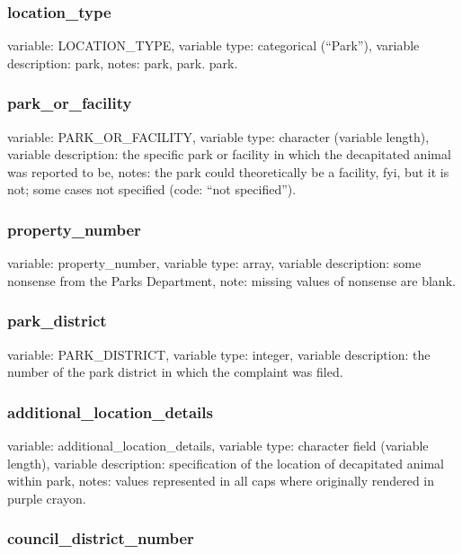 \documentclass[]{article}
\begin{document}
\subsubsection{location\_type}\label{locationux5ftype}

variable: LOCATION\_TYPE, variable type: categorical (``Park''),
variable description: park, notes: park, park. park.

\subsubsection{park\_or\_facility}\label{parkux5forux5ffacility}

variable: PARK\_OR\_FACILITY, variable type: character (variable
length), variable description: the specific park or facility in which
the decapitated animal was reported to be, notes: the park could
theoretically be a facility, fyi, but it is not; some cases not
specified (code: ``not specified'').

\subsubsection{property\_number}\label{propertyux5fnumber}

variable: property\_number, variable type: array, variable description:
some nonsense from the Parks Department, note: missing values of
nonsense are blank.

\subsubsection{park\_district}\label{parkux5fdistrict}

variable: PARK\_DISTRICT, variable type: integer, variable description:
the number of the park district in which the complaint was filed.

\subsubsection{additional\_location\_details}\label{additionalux5flocationux5fdetails}

variable: additional\_location\_details, variable type: character field
(variable length), variable description: specification of the location
of decapitated animal within park, notes: values represented in all caps
where originally rendered in purple crayon.

\subsubsection{council\_district\_number}\label{councilux5fdistrictux5fnumber}
\end{document}
